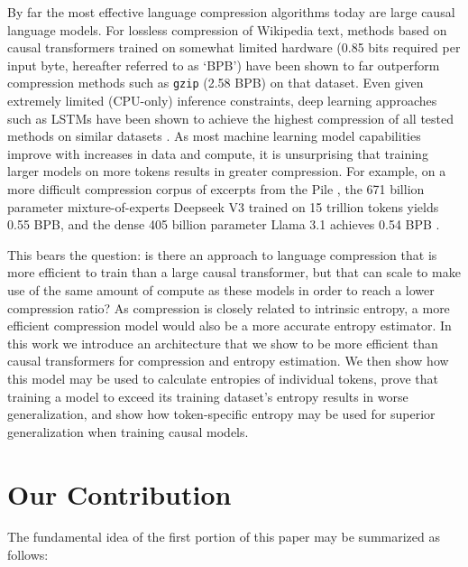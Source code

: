 \documentclass{article}
\begin{document}
    By far the most effective language compression algorithms today are large causal language models. For lossless compression of Wikipedia text, methods based on causal transformers trained on somewhat limited hardware (0.85 bits required per input byte, hereafter referred to as `BPB') have been shown to far outperform compression methods such as \texttt{gzip} (2.58 BPB) \citep{bellard2019lossless, mahoneylargetext} on that dataset. Even given extremely limited (CPU-only) inference constraints, deep learning approaches such as LSTMs have been shown to achieve the highest compression of all tested methods on similar datasets \citep{hutterprize, knollcmix}. As most machine learning model capabilities improve with increases in data and compute, it is unsurprising that training larger models on more tokens results in greater compression. For example, on a more difficult compression corpus of excerpts from the Pile \citep{gao2020pile}, the 671 billion parameter mixture-of-experts Deepseek V3 trained on 15 trillion tokens yields 0.55 BPB, and the dense 405 billion parameter Llama 3.1 achieves 0.54 BPB \citep{deepseekai2025deepseekv3technicalreport}. 

    This bears the question: is there an approach to language compression that is more efficient to train than a large causal transformer, but that can scale to make use of the same amount of compute as these models in order to reach a lower compression ratio? As compression is closely related to intrinsic entropy, a more efficient compression model would also be a more accurate entropy estimator. In this work we introduce an architecture that we show to be more efficient than causal transformers for compression and entropy estimation. We then show how this model may be used to calculate entropies of individual tokens, prove that training a model to exceed its training dataset's entropy results in worse generalization, and show how token-specific entropy may be used for superior generalization when training causal models.

\section{Our Contribution}

    The fundamental idea of the first portion of this paper may be summarized as follows:
    \vspace{0.15cm}

    \vspace{0.15cm}
\end{document}

